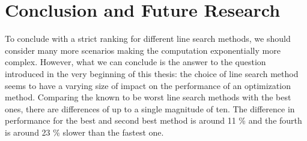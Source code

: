 \documentclass[a4paper,english,titlepage,12pt]{article}
\begin{document}








\section{Conclusion and Future Research}

To conclude with a strict ranking for different line search methods, we should consider many more scenarios making the computation exponentially more complex. However, what we can conclude is the answer to the question introduced in the very beginning of this thesis: the choice of line search method seems to have a varying size of impact on the performance of an optimization method. Comparing the known to be worst line search methods with the best ones, there are differences of up to a single magnitude of ten. The difference in performance for the best and second best method is around 11 \% and the fourth is around 23 \% slower than the fastest one.
\end{document}
